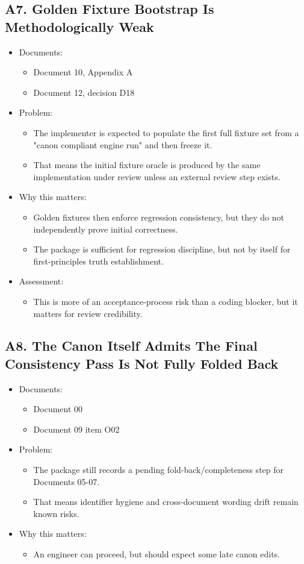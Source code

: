\documentclass[11pt]{article}
\begin{document}
\subsection{A7. Golden Fixture Bootstrap Is Methodologically Weak}
\label{sec:org9fdd768}
\begin{itemize}
\item Documents:
\begin{itemize}
\item Document 10, Appendix A
\item Document 12, decision D18
\end{itemize}
\item Problem:
\begin{itemize}
\item The implementer is expected to populate the first full fixture set from a "canon compliant engine run" and then freeze it.
\item That means the initial fixture oracle is produced by the same implementation under review unless an external review step exists.
\end{itemize}
\item Why this matters:
\begin{itemize}
\item Golden fixtures then enforce regression consistency, but they do not independently prove initial correctness.
\item The package is sufficient for regression discipline, but not by itself for first-principles truth establishment.
\end{itemize}
\item Assessment:
\begin{itemize}
\item This is more of an acceptance-process risk than a coding blocker, but it matters for review credibility.
\end{itemize}
\end{itemize}
\subsection{A8. The Canon Itself Admits The Final Consistency Pass Is Not Fully Folded Back}
\label{sec:orgebc8343}
\begin{itemize}
\item Documents:
\begin{itemize}
\item Document 00
\item Document 09 item O02
\end{itemize}
\item Problem:
\begin{itemize}
\item The package still records a pending fold-back/completeness step for Documents 05-07.
\item That means identifier hygiene and cross-document wording drift remain known risks.
\end{itemize}
\item Why this matters:
\begin{itemize}
\item An engineer can proceed, but should expect some late canon edits.
\end{itemize}
\end{itemize}
\end{document}
